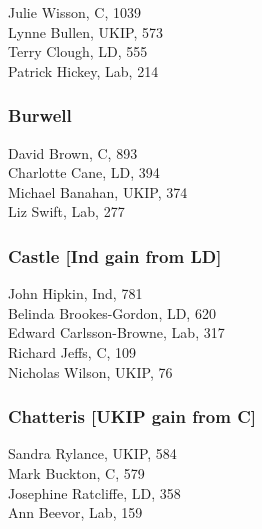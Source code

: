 \documentclass[a4paper,openany,10pt]{book}
\begin{document}


Julie Wisson, C, 1039\\
Lynne Bullen, UKIP, 573\\
Terry Clough, LD, 555\\
Patrick Hickey, Lab, 214\\


\subsubsection*{Burwell}



David Brown, C, 893\\
Charlotte Cane, LD, 394\\
Michael Banahan, UKIP, 374\\
Liz Swift, Lab, 277\\


\subsubsection*{Castle \hspace*{\fill}\nolinebreak[1]%
\enspace\hspace*{\fill}
[Ind gain from LD]}



John Hipkin, Ind, 781\\
{Belinda Brookes-Gordon}, LD, 620\\
{Edward Carlsson-Browne}, Lab, 317\\
Richard Jeffs, C, 109\\
Nicholas Wilson, UKIP, 76\\


\subsubsection*{Chatteris \hspace*{\fill}\nolinebreak[1]%
\enspace\hspace*{\fill}
[UKIP gain from C]}



Sandra Rylance, UKIP, 584\\
Mark Buckton, C, 579\\
Josephine Ratcliffe, LD, 358\\
Ann Beevor, Lab, 159\\
\end{document}
